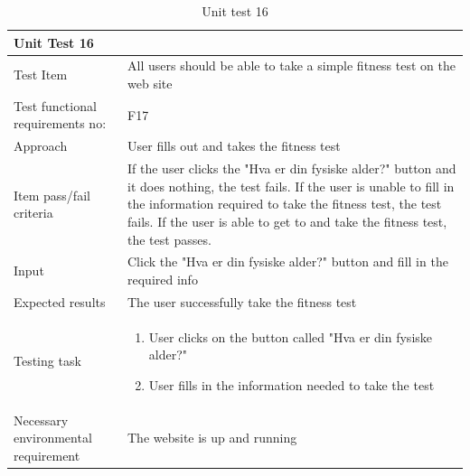 \begin{table}[H]
\begin{tabular}{ | L{0.25\linewidth} | L{0.75\linewidth} | } 
 \hline {}
 Unit Test 16 & \\
 \hline
 Test Item & All users should be able to take a simple fitness test on the web site\\
 \hline
 Test functional requirements no: & F17
 \\
 \hline
 Approach & User fills out and takes the fitness test\\
  \hline
 Item pass/fail criteria & If the user clicks the "Hva er din fysiske alder?" button and it does nothing, the test fails. If the user is unable to fill in the information required to take the fitness test, the test fails. If the user is able to get to and take the fitness test, the test passes.  \\
 \hline
 Input & Click the "Hva er din fysiske alder?" button and fill in the required info\\ 
 \hline
 Expected results & The user successfully take the fitness test\\
  \hline
Testing task &
    \vspace{-5mm}
    \begin{enumerate}[noitemsep]
  \item User clicks on the button called "Hva er din fysiske alder?"
  \item User fills in the information needed to take the test
   \end{enumerate}\\
 \hline
 Necessary environmental requirement & The website is up and running\\
 \hline
\end{tabular}
\caption{Unit test 16}
\end{table}

